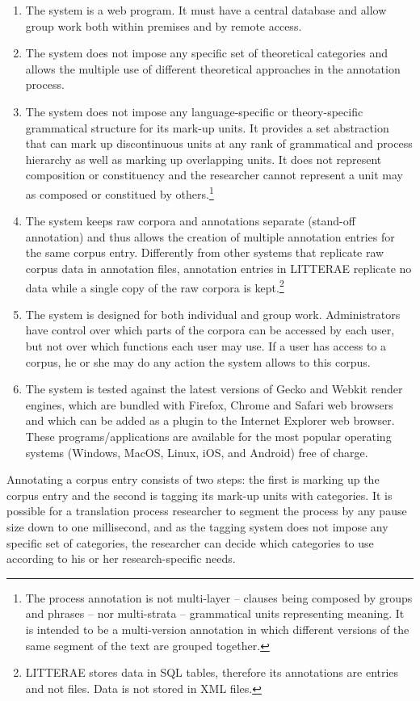 \documentclass[output=paper]{LSP/langsci}
\begin{document}
\begin{enumerate}
\item  The system is a web program. It must have a central database and allow group work both within premises and by remote access.
\item  The system does not impose any specific set of theoretical categories and allows the multiple use of different theoretical approaches in the annotation process.
\item  The system does not impose any language-specific or theory-specific grammatical structure for its mark-up units. It provides a set abstraction that can mark up discontinuous units at any rank of grammatical and process hierarchy as well as marking up overlapping units. It does not represent composition or constituency and the researcher cannot represent a unit may as composed or constitued by others.\footnote{The process annotation is not multi-layer -- clauses being composed by groups and phrases -- nor multi-strata -- grammatical units representing meaning. It is intended to be a multi-version annotation in which different versions of the same segment of the text are grouped together.}
\item  The system keeps raw corpora and annotations separate (stand-off annotation) and thus allows the creation of multiple annotation entries for the same corpus entry. Differently from other systems that replicate raw corpus data in annotation files, annotation entries in LITTERAE replicate no data while a single copy of the raw corpora is kept.\footnote{LITTERAE stores data in SQL tables, therefore its annotations are entries and not files. Data is not stored in XML files.}
\item  The system is designed for both individual and group work. Administrators have control over which parts of the corpora can be accessed by each user, but not over which functions each user may use. If a user has access to a corpus, he or she may do any action the system allows to this corpus.
\item  The system is tested against the latest versions of Gecko and Webkit render engines, which are bundled with Firefox, Chrome and Safari web browsers and which can be added as a plugin to the Internet Explorer web browser. These programs/applications are available for the most popular operating systems (Windows, MacOS, Linux, iOS, and Android) free of charge.\\
\end{enumerate}

Annotating a corpus entry consists of two steps: the first is marking up the corpus entry and the second is tagging its mark-up units with categories. It is possible for a translation process researcher to segment the process by any pause size down to one millisecond, and as the tagging system does not impose any specific set of categories, the researcher can decide which categories to use according to his or her research-specific needs.
\end{document}
